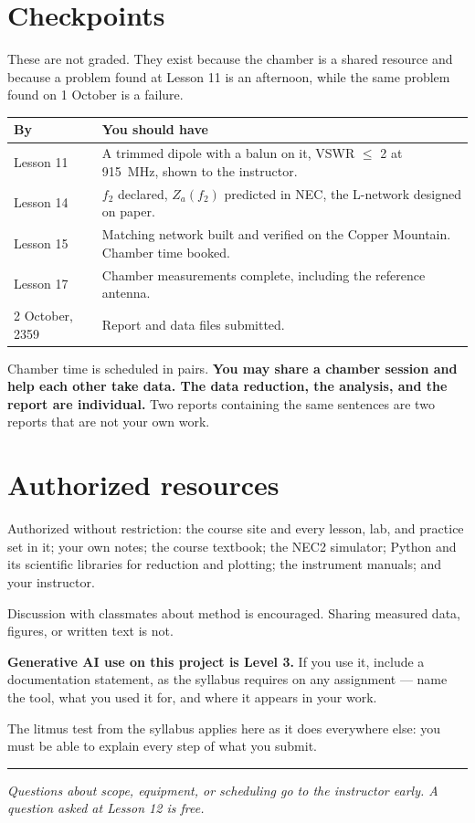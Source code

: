\documentclass{exam}
\def\fOne{915}
\def\duedate{2 October, 2359}
\begin{document}
\section{Checkpoints}

These are not graded. They exist because the chamber is a shared resource and
because a problem found at Lesson 11 is an afternoon, while the same problem
found on 1 October is a failure.

\begin{center}
\begin{tabular}{|l|p{3.9in}|}
\hline
\textbf{By} & \textbf{You should have} \\
\hline
Lesson 11 & A trimmed dipole with a balun on it, VSWR $\le$ 2 at \fOne\ MHz,
shown to the instructor. \\
\hline
Lesson 14 & $f_2$ declared, $Z_a(f_2)$ predicted in NEC, the L-network
designed on paper. \\
\hline
Lesson 15 & Matching network built and verified on the Copper Mountain.
Chamber time booked. \\
\hline
Lesson 17 & Chamber measurements complete, including the reference antenna. \\
\hline
\duedate & Report and data files submitted. \\
\hline
\end{tabular}
\end{center}

Chamber time is scheduled in pairs. \textbf{You may share a chamber session
and help each other take data. The data reduction, the analysis, and the
report are individual.} Two reports containing the same sentences are two
reports that are not your own work.

\section{Authorized resources}

Authorized without restriction: the course site and every lesson, lab, and
practice set in it; your own notes; the course textbook; the NEC2 simulator;
Python and its scientific libraries for reduction and plotting; the
instrument manuals; and your instructor.

Discussion with classmates about method is encouraged. Sharing measured data,
figures, or written text is not.

\textbf{Generative AI use on this project is Level 3.} If you use it, include
a documentation statement, as the syllabus requires on any assignment --- name
the tool, what you used it for, and where it appears in your work.

The litmus test from the syllabus applies here as it does everywhere else: you
must be able to explain every step of what you submit.

\vspace{6pt}
\hrule
\vspace{6pt}

\begin{center}
\textit{Questions about scope, equipment, or scheduling go to the instructor
early. A question asked at Lesson 12 is free.}
\end{center}
\end{document}
